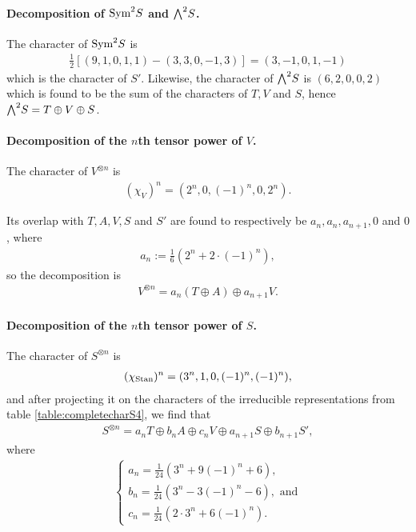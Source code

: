 \begin{example}
	\paragraph{Decomposition of $\text{Sym}^2S$ and ${\bigwedge}^2S$.} The character of $\text{Sym}^2S$ is 
	\begin{align*}
		\frac{1}{2}\left[ (9,1,0,1,1)-(3,3,0,-1,3) \right] = (3,-1,0,1,-1)
	\end{align*}
	which is the character of $S'$. Likewise, the character of ${\bigwedge}^2S$ is $(6,2,0,0,2)$ which is found to be the sum of the characters of $T, V$ and $S$, hence ${\bigwedge}^2S = T \oplus V \oplus S$.
	
	\paragraph{Decomposition of the $n$th tensor power of $V$.}	The character of $V^{\otimes n}$ is
	\begin{align*}
		(\chi_{V})^n = (2^n, 0, (-1)^n, 0, 2^n).
	\end{align*}
	
	Its overlap with $T, A, V, S$ and $S'$ are found to respectively be $a_n, a_n, a_{n+1}, 0$ and $0$, where 
	\begin{align*}
		a_n := \frac{1}{6}\left( 2^n + 2 \cdot (-1)^n \right),
	\end{align*}
	so the decomposition is
	\begin{align*}
		V^{\otimes n} = a_n (T \oplus A) \oplus a_{n+1} V.
	\end{align*}
	
	\paragraph{Decomposition of the $n$th tensor power of $S$.} The character of $S^{\otimes n}$ is 
	\begin{align*}
		(\chi_{\text{Stan}})^n = (3^n, 1, 0, (-1)^n, (-1)^n),
	\end{align*}
	and after projecting it on the characters of the irreducible representations from table \ref{table:completecharS4}, we find that
	\begin{align}\label{eq:nthpowerS}
		S^{\otimes n} = a_n T \oplus b_n A \oplus c_n V \oplus a_{n+1} S \oplus b_{n+1} S',
	\end{align}
	where 
	\begin{align*}
		\begin{cases}
			a_n = \frac{1}{24}(3^n + 9(-1)^n+6), \\
			b_n = \frac{1}{24}(3^n - 3(-1)^n -6), \text{ and} \\
			c_n = \frac{1}{24}(2\cdot 3^n + 6(-1)^n).
		\end{cases}
	\end{align*}
	

\end{example}
